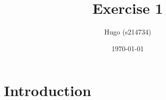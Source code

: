 \documentclass{article}
\title{Exercise 1}
\author{Hugo (s214734)}
\date{\today}
\begin{document}
\maketitle

\section{Introduction}
\end{document}
